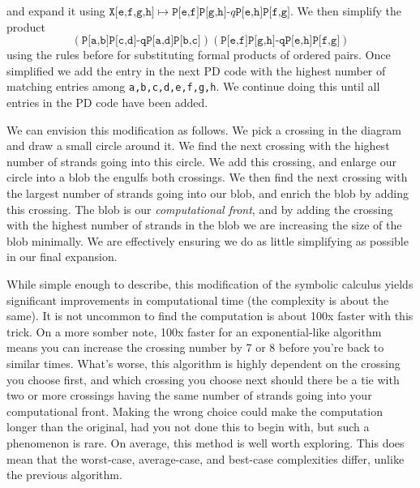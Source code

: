         and expand it using
        $\texttt{X[e,f,g,h]}\mapsto\texttt{P[e,f]P[g,h]-$q$P[e,h]P[f,g]}$. We
        then simplify the product
        \begin{equation}
            \nonumber
            (\texttt{P[a,b]P[c,d]-qP[a,d]P[b,c]})
            (\texttt{P[e,f]P[g,h]-qP[e,h]P[f,g]})
        \end{equation}
        using the rules before for substituting formal products of ordered
        pairs. Once simplified we add the entry in the next PD code with the
        highest number of matching entries among
        \texttt{a,b,c,d,e,f,g,h}. We continue doing this until all entries in
        the PD code have been added.
        \par\hfill\par
        We can envision this modification as follows. We pick a crossing in
        the diagram and draw a small circle around it. We find the next
        crossing with the highest number of strands going into this circle.
        We add this crossing, and enlarge our circle into a blob the engulfs
        both crossings. We then find the next crossing with the largest number
        of strands going into our blob, and enrich the blob by adding this
        crossing. The blob is our \textit{computational front}, and by
        adding the crossing with the highest number of strands in the blob we
        are increasing the size of the blob minimally. We are effectively
        ensuring we do as little simplifying as possible in our final
        expansion.
        \par\hfill\par
        While simple enough to describe, this modification of the symbolic
        calculus yields significant improvements in computational time (the
        complexity is about the same). It is not uncommon to find the
        computation is about 100x faster with this trick. On a more somber
        note, 100x faster for an exponential-like algorithm means you can
        increase the crossing number by 7 or 8 before you're back to similar
        times. What's worse, this algorithm is highly dependent on the
        crossing you choose first, and which crossing you choose next should
        there be a tie with two or more crossings
        having the same number of strands
        going into your computational front. Making the wrong choice could
        make the computation longer than the original,
        had you not done this to begin with,
        but such a phenomenon is rare. On average, this method is well worth
        exploring. This does mean that the worst-case, average-case, and
        best-case complexities differ, unlike the previous algorithm.

